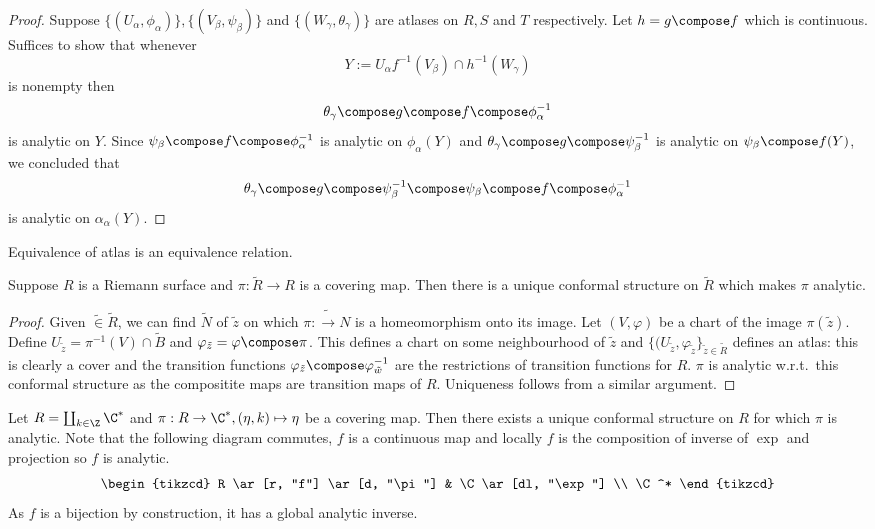 \documentclass[a4paper]{article}
\begin{document}
\begin{proof}
  Suppose \(\{(U_\alpha, \phi_\alpha)\}, \{(V_\beta, \psi_\beta)\}\) and \(\{(W_\gamma, \theta_\gamma)\}\) are atlases on \(R, S\) and \(T\) respectively. Let \(h = g \compose f\) which is continuous. Suffices to show that whenever
  \[
    Y := U_\alpha f^{-1}(V_\beta) \cap h^{-1} (W_\gamma)
  \]
  is nonempty then
  \[
    \theta_\gamma \compose g \compose f \compose \phi_\alpha^{-1}
  \]
  is analytic on \(Y\). Since \(\psi_\beta \compose f \compose \phi_\alpha^{-1}\) is analytic on \(\phi_\alpha(Y)\) and \(\theta_\gamma \compose g \compose \psi_\beta^{-1}\) is analytic on \(\psi_\beta \compose f (Y)\), we concluded that
  \[
    \theta_\gamma \compose g \compose \psi_\beta^{-1} \compose \psi_\beta \compose f \compose \phi_\alpha^{-1}
  \]
  is analytic on \(\alpha_\alpha(Y)\).
\end{proof}

\begin{corollary}
  Equivalence of atlas is an equivalence relation.
\end{corollary}

\begin{proposition}
  Suppose \(R\) is a Riemann surface and \(\pi: \tilde R \to R\) is a covering map. Then there is a unique conformal structure on \(\tilde R\) which makes \(\pi\) analytic.
\end{proposition}

\begin{proof}
  Given \(\tilde \in \tilde R\), we can find \(\tilde N\) of \(\tilde z\) on which \(\pi: \tilde \to N\) is a homeomorphism onto its image. Let \((V, \varphi)\) be a chart of the image \(\pi(\tilde z)\). Define \(U_{\tilde z} = \pi^{-1}(V) \cap \tilde B\) and \(\varphi_{\tilde z} = \varphi \compose \pi\). This defines a chart on some neighbourhood of \(\tilde z\) and \(\{(U_{\tilde z}, \varphi_{\tilde z}\}_{\tilde z \in \tilde R}\) defines an atlas: this is clearly a cover and the transition functions \(\varphi_{\tilde z} \compose \varphi_{\tilde w}^{-1}\) are the restrictions of transition functions for \(R\). \(\pi\) is analytic w.r.t.\ this conformal structure as the compositite maps are transition maps of \(R\). Uniqueness follows from a similar argument.
\end{proof}

\begin{eg}
  Let \(R = \coprod_{k \in \Z} \C^*\) and \(\pi: R \to \C^*, (\eta, k) \mapsto \eta\) be a covering map. Then there exists a unique conformal structure on \(R\) for which \(\pi\) is analytic. Note that the following diagram commutes, \(f\) is a continuous map and locally \(f\) is the composition of inverse of \(\exp\) and projection so \(f\) is analytic.
  \[
    \begin{tikzcd}
      R \ar[r, "f"] \ar[d, "\pi"] & \C \ar[dl, "\exp"] \\
      \C^*
    \end{tikzcd}
  \]
  As \(f\) is a bijection by construction, it has a global analytic inverse.
\end{eg}
\end{document}
